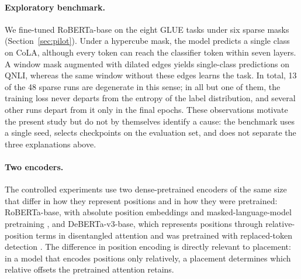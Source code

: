 \documentclass[10pt]{article}
\begin{document}
\paragraph{Exploratory benchmark.} We fine-tuned RoBERTa-base \citep{liu2019roberta} on the eight GLUE tasks \citep{wang2019glue} under six sparse masks (Section~\ref{sec:pilot}). Under a hypercube mask, the model predicts a single class on CoLA, although every token can reach the classifier token within seven layers. A window mask augmented with dilated edges yields single-class predictions on QNLI, whereas the same window without these edges learns the task. In total, 13 of the 48 sparse runs are degenerate in this sense; in all but one of them, the training loss never departs from the entropy of the label distribution, and several other runs depart from it only in the final epochs. These observations motivate the present study but do not by themselves identify a cause: the benchmark uses a single seed, selects checkpoints on the evaluation set, and does not separate the three explanations above.

\paragraph{Two encoders.} The controlled experiments use two dense-pretrained encoders of the same size that differ in how they represent positions and in how they were pretrained: RoBERTa-base, with absolute position embeddings and masked-language-model pretraining \citep{liu2019roberta}, and DeBERTa-v3-base, which represents positions through relative-position terms in disentangled attention \citep{he2021deberta} and was pretrained with replaced-token detection \citep{clark2020electra,he2023debertav3}. The difference in position encoding is directly relevant to placement: in a model that encodes positions only relatively, a placement determines which relative offsets the pretrained attention retains.
\end{document}
